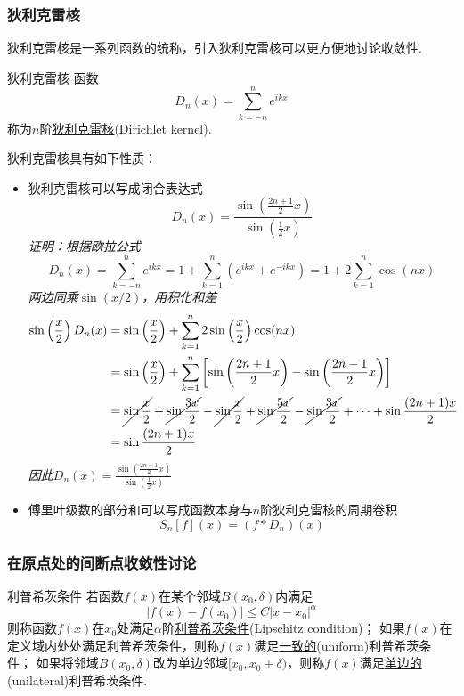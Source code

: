 \subsubsection{狄利克雷核}

狄利克雷核是一系列函数的统称，引入狄利克雷核可以更方便地讨论收敛性.

\begin{definition}{狄利克雷核}
    函数
    \[D_n(x) = \sum_{k=-n}^{n}e^{ikx}\]
    称为\(n\)阶\uline{狄利克雷核}(Dirichlet kernel).
\end{definition}

狄利克雷核具有如下性质：
\begin{itemize}
    \item [(1)] 狄利克雷核可以写成闭合表达式
    \[D_n(x)=\frac{\sin\left(\frac{2n+1}{2}x\right)}{\sin\left(\frac{1}{2}x\right)}\]
    \textit{
        证明：根据欧拉公式
        \[D_n(x) = \sum_{k=-n}^{n}e^{ikx} = 1+\sum_{k=1}^{n}(e^{ikx}+e^{-ikx}) = 1+2\sum_{k=1}^{n}\cos(nx)\]
        两边同乘\(\sin(x/2)\)，用积化和差
        \begin{align*}
            \sin\left(\frac{x}{2}\right)D_n(x) &= \sin\left(\frac{x}{2}\right)+\sum_{k=1}^{n}2\sin\left(\frac{x}{2}\right)\cos(nx) \\
            &= \sin\left(\frac{x}{2}\right)+\sum_{k=1}^{n}\left[\sin\left(\frac{2n+1}{2}x\right)-\sin\left(\frac{2n-1}{2}x\right)\right] \\
            &= \cancel{\sin\frac{x}{2}}+\cancel{\sin\frac{3x}{2}}-\cancel{\sin\frac{x}{2}}+\cancel{\sin\frac{5x}{2}}-\cancel{\sin\frac{3x}{2}}+\cdots+\sin\frac{(2n+1)x}{2} \\
            &= \sin\frac{(2n+1)x}{2}
        \end{align*}
        因此\(\displaystyle{D_n(x)=\frac{\sin\left(\frac{2n+1}{2}x\right)}{\sin\left(\frac{1}{2}x\right)}}\)
    }
    \item [(2)] 傅里叶级数的部分和可以写成函数本身与\(n\)阶狄利克雷核的周期卷积
    \[S_n[f](x) = (f*D_n)(x)\]
\end{itemize}

\subsubsection{在原点处的间断点收敛性讨论}

\begin{definition}{利普希茨条件}
    若函数\(f(x)\)在某个邻域\(B(x_0,\delta)\)内满足
    \[|f(x)-f(x_0)| \leq C|x-x_0|^\alpha\]
    则称函数\(f(x)\)在\(x_0\)处满足\(\alpha\)阶\uline{利普希茨条件}(Lipschitz condition)；
    \newline
    如果\(f(x)\)在定义域内处处满足利普希茨条件，则称\(f(x)\)满足\uline{一致的}(uniform)利普希茨条件；
    \newline
    如果将邻域\(B(x_0,\delta)\)改为单边邻域\([x_0,x_0+\delta)\)，则称\(f(x)\)满足\uline{单边的}(unilateral)利普希茨条件.
\end{definition}

